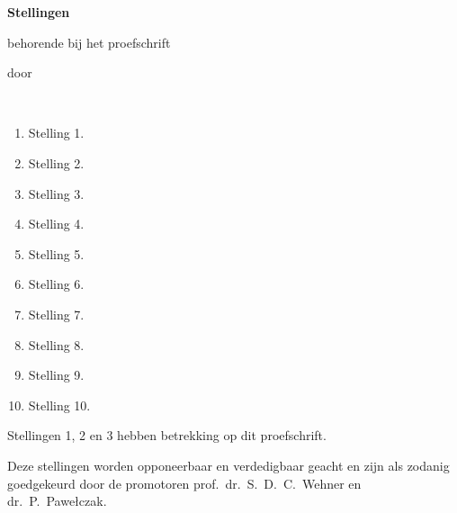 \begin{center}

{\Large\titlefont\bfseries Stellingen}

\medskip

behorende bij het proefschrift

\medskip

{\makeatletter
\titlestyle\bfseries\large\@title
\makeatother}

{\makeatletter
\ifx\@subtitle\undefined\else
\titlefont\titleshape\@subtitle
\fi
\makeatother}

\medskip

door

\medskip

\makeatletter
{\large\titlefont\bfseries\@firstname\ {\titleshape\@lastname}}
\makeatother

\end{center}

\bigskip

\begin{enumerate}[widest=10]
    \item Stelling 1.
    \item Stelling 2.
    \item Stelling 3.
    \item Stelling 4.
    \item Stelling 5.
    \item Stelling 6.
    \item Stelling 7.
    \item Stelling 8.
    \item Stelling 9.
    \item Stelling 10.
\end{enumerate}

\bigskip \noindent
Stellingen 1, 2 en 3 hebben betrekking op dit proefschrift.

\bigskip \noindent
Deze stellingen worden opponeerbaar en verdedigbaar geacht en zijn als zodanig goedgekeurd door de
promotoren prof.\ dr.\ S.\ D.\ C.\ Wehner en dr.\ P.\ Pawełczak.
